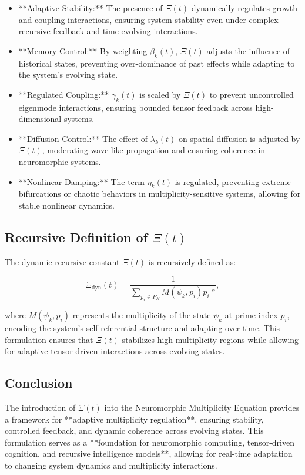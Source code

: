 \documentclass{article}
\theoremstyle{plain}
\begin{document}
\begin{itemize}
\begin{itemize}
    \item **Adaptive Stability:** The presence of \(\Xi(t) \) dynamically regulates growth and coupling interactions, ensuring system stability even under complex recursive feedback and time-evolving interactions.
    \item **Memory Control:** By weighting \( \beta_k(t) \), \(\Xi(t) \) adjusts the influence of historical states, preventing over-dominance of past effects while adapting to the system's evolving state.
    \item **Regulated Coupling:** \( \gamma_k(t) \) is scaled by \(\Xi(t) \) to prevent uncontrolled eigenmode interactions, ensuring bounded tensor feedback across high-dimensional systems.
    \item **Diffusion Control:** The effect of \( \lambda_k(t) \) on spatial diffusion is adjusted by \(\Xi(t) \), moderating wave-like propagation and ensuring coherence in neuromorphic systems.
    \item **Nonlinear Damping:** The term \( \eta_k(t) \) is regulated, preventing extreme bifurcations or chaotic behaviors in multiplicity-sensitive systems, allowing for stable nonlinear dynamics.
\end{itemize}

\subsection{Recursive Definition of \(\Xi(t) \)}

The dynamic recursive constant \(\Xi(t) \) is recursively defined as:

\begin{equation}
\Xi_{\text{dyn}}(t) = \frac{1}{\sum_{p_i \in P_N} M(\psi_k, p_i) p_i^{-\alpha}},
\end{equation}

where \( M(\psi_k, p_i) \) represents the multiplicity of the state \( \psi_k \) at prime index \( p_i \), encoding the system’s self-referential structure and adapting over time. This formulation ensures that \(\Xi(t) \) stabilizes high-multiplicity regions while allowing for adaptive tensor-driven interactions across evolving states.

\subsection{Conclusion}

The introduction of \(\Xi(t) \) into the Neuromorphic Multiplicity Equation provides a framework for **adaptive multiplicity regulation**, ensuring stability, controlled feedback, and dynamic coherence across evolving states. This formulation serves as a **foundation for neuromorphic computing, tensor-driven cognition, and recursive intelligence models**, allowing for real-time adaptation to changing system dynamics and multiplicity interactions.





\end{itemize}
\end{document}
